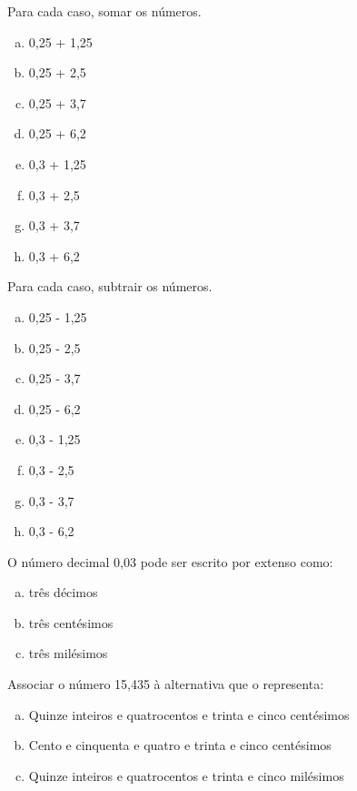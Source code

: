 \item Para cada caso, somar os números.
\begin{multicols}{4}
\begin{enumerate}[a)]
	\item 0,25 + 1,25
	\item 0,25 + 2,5
	\item 0,25 + 3,7
	\item 0,25 + 6,2
	\item 0,3 + 1,25
	\item 0,3 + 2,5
	\item 0,3 + 3,7
	\item 0,3 + 6,2
\end{enumerate}
\end{multicols}

\item Para cada caso, subtrair os números.
\begin{multicols}{4}
\begin{enumerate}[a)]
	\item 0,25 - 1,25
	\item 0,25 - 2,5
	\item 0,25 - 3,7
	\item 0,25 - 6,2
	\item 0,3 - 1,25
	\item 0,3 - 2,5
	\item 0,3 - 3,7
	\item 0,3 - 6,2
\end{enumerate}
\end{multicols}

\item O número decimal 0,03 pode ser escrito por extenso como:
\begin{multicols}{4}
\begin{enumerate}[a)]
	\item três décimos
	\item três centésimos
	\item três milésimos
\end{enumerate}
\end{multicols}

\item Associar o número 15,435 à alternativa que o representa:
\begin{enumerate}[a)]
	\item Quinze inteiros e quatrocentos e trinta e cinco centésimos
	\item Cento e cinquenta e quatro e trinta e cinco centésimos
	\item Quinze inteiros e quatrocentos e trinta e cinco milésimos
\end{enumerate}

